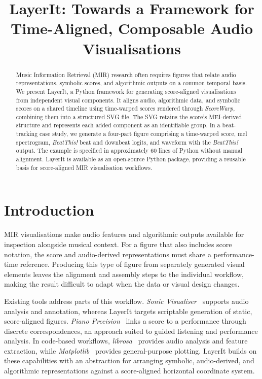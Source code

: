 \documentclass{article}
\title{LayerIt: \linebreak Towards a Framework for Time-Aligned, Composable Audio Visualisations}
\begin{document}
%
\maketitle
%
\begin{abstract}
Music Information Retrieval (MIR) research often requires figures that relate audio representations, symbolic scores, and algorithmic outputs on a common temporal basis. We present LayerIt, a Python framework for generating score-aligned visualisations from independent visual components. It aligns audio, algorithmic data, and symbolic scores on a shared timeline using time-warped scores rendered through \textit{ScoreWarp}, combining them into a structured SVG file. The SVG retains the score's MEI-derived structure and represents each added component as an identifiable group. In a beat-tracking case study, we generate a four-part figure comprising a time-warped score, mel spectrogram, \textit{BeatThis!} beat and downbeat logits, and waveform with the \textit{BeatThis!} output. The example is specified in approximately 60 lines of Python without manual alignment. LayerIt is available as an open-source Python package, providing a reusable basis for score-aligned MIR visualisation workflows.
\end{abstract}
%
\section{Introduction}\label{sec:introduction}

MIR visualisations make audio features and algorithmic outputs available for inspection alongside musical context. For a figure that also includes score notation, the score and audio-derived representations must share a performance-time reference. Producing this type of figure from separately generated visual elements leaves the alignment and assembly steps to the individual workflow, making the result difficult to adapt when the data or visual design changes.

Existing tools address parts of this workflow. \textit{Sonic Visualiser}~\cite{cannamSonicVisualiser2010} supports audio analysis and annotation, whereas LayerIt targets scriptable generation of static, score-aligned figures. \textit{Piano Precision}~\cite{PianoPrecision} links a score to a performance through discrete correspondences, an approach suited to guided listening and performance analysis. In code-based workflows, \textit{librosa}~\cite{mcfeeLibrosaAudioMusic2015} provides audio analysis and feature extraction, while \textit{Matplotlib}~\cite{Hunter:2007} provides general-purpose plotting. LayerIt builds on these capabilities with an abstraction for arranging symbolic, audio-derived, and algorithmic representations against a score-aligned horizontal coordinate system.
\end{document}
